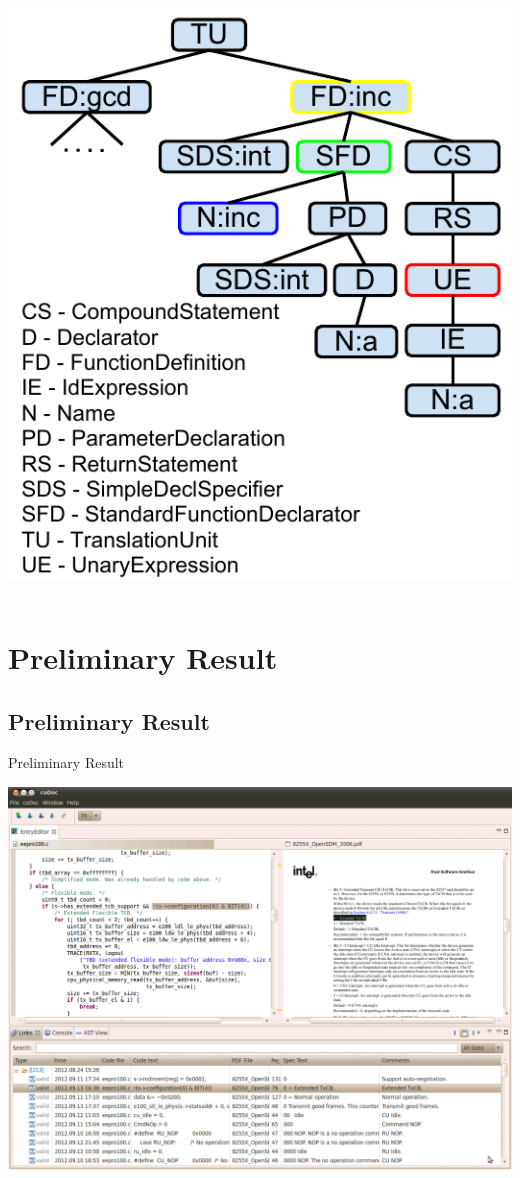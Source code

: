 \documentclass[]{beamer}
\begin{document}
\begin{frame}
\begin{columns}[c]
  \includegraphics[height=.75\textheight]{ast23}
  \end{columns}
\end{frame}

\section{Preliminary Result}
\subsection{Preliminary Result}
\begin{frame}{\centerline{Preliminary Result}}
  \begin{center}
  \includegraphics[width=.9\textwidth]{platformview}
  \end{center}
\end{frame}
\end{document}
